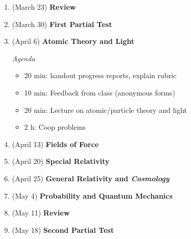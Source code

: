 \documentclass[12pt]{article}
\begin{document}
\clearpage
\begin{enumerate}
	
	\item (March 23) \textbf{Review}
	
	\item (March 30) \textbf{First Partial Test}
	
	\item (April 6) \textbf{Atomic Theory and Light}
	
\noindent\textit{Agenda}
\begin{itemize}
\item 20 min: handout progress reports, explain rubric
\item 10 min: Feedback from class (anonymous forms)
\item 20 min: Lecture on atomic/particle theory and light
\item 2 h: Coop problems
\end{itemize}
	
	\item (April 13) \textbf{Fields of Force}
	
	\item (April 20) \textbf{Special Relativity}
	
	\item (April 25) \textbf{General Relativity and \textit{Cosmology}}
	
	\item (May 4) \textbf{Probability and Quantum Mechanics}
	
	\item (May 11) \textbf{Review}
	
	\item (May 18) \textbf{Second Partial Test}
\end{enumerate}
\end{document}
